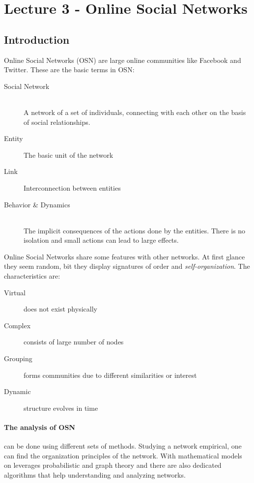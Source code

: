 \section{Lecture 3 - Online Social Networks} %
\label{sec:lecture_3_online_social_networks}

\subsection{Introduction} %
\label{sub:introduction}
Online Social Networks (OSN) are large online communities like Facebook and Twitter.
These are the basic terms in OSN:\\
\begin{description}
	\item[Social Network] \hfill \\
	A network of a set of individuals,
	connecting with each other on the basis of social relationships.
	\item[Entity] The basic unit of the network
	\item[Link] Interconnection between entities
	\item[Behavior \& Dynamics] \hfill \\
	The implicit consequences of the actions done by the entities.
	There is no isolation and small actions can lead to large effects.
\end{description}

Online Social Networks share some features with other networks.
At first glance they seem random,
bit they display signatures of order and \emph{self-organization}.
The characteristics are:\\
\begin{description}
	\item[Virtual] does not exist physically
	\item[Complex] consists of large number of nodes
	\item[Grouping] forms communities due to different similarities or interest
	\item[Dynamic] structure evolves in time
\end{description}

\paragraph{The analysis of OSN} %
\label{par:the_analysis_of_osn}
can be done using different sets of methods.
Studying a network empirical, one can find the organization principles of the network.
With mathematical models on leverages probabilistic and graph theory
and there are also dedicated algorithms that help understanding  and analyzing networks.

